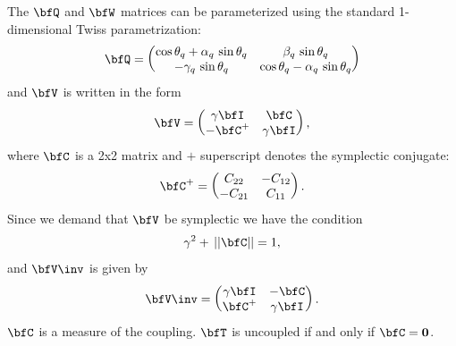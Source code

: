 The $\bfQ$ and $\bfW$ matrices can be parameterized using the standard 1-dimensional Twiss
parametrization:
\begin{equation}
  \bfQ = \begin{pmatrix}
    \cos\theta_q + \alpha_q \, \sin\theta_q & \beta_q \, \sin\theta_q \\
    -\gamma_q \, \sin\theta_q & \cos\theta_q - \alpha_q \, \sin\theta_q
    \end{pmatrix}
\end{equation}
and $\bfV$ is written in the form
  \begin{equation}
    \bfV = 
    \begin{pmatrix}
        \gamma \bfI & \bfC \cr 
        -\bfC^+     & \gamma \bfI \cr
    \end{pmatrix}
    , \label{vgicc1}
  \end{equation}
where $\bfC$ is a 2x2 matrix and $+$ superscript 
denotes the symplectic conjugate:
  \begin{equation}
    \bfC^+ = 
    \begin{pmatrix}
       C_{22} & -C_{12} \cr 
      -C_{21} & C_{11} \cr
    \end{pmatrix}
    . \label{ccccc}
  \end{equation}
Since we demand that $\bfV$ be symplectic we have the condition
  \begin{equation}               
    \gamma^2 + \, ||\bfC|| = 1
    , \label{gc1}
  \end{equation}
and $\bfV\inv$ is given by
  \begin{equation}
    \bfV\inv = 
    \begin{pmatrix}
      \gamma \bfI & -\bfC \cr 
      \bfC^+ & \gamma \bfI \cr
    \end{pmatrix}
    . \label{vgicc2}
  \end{equation} 
$\bfC$ is a measure of the coupling. $\bfT$ is uncoupled if and only if $\bfC = \Bf 0$.

